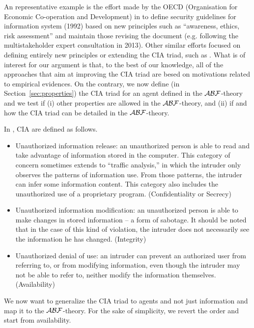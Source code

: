 An representative example is the effort made by the OECD (Organisation for Economic
Co-operation and Development) in \autocite{OECD2013guidelines} to define
security guidelines for information system (1992) based on new principles such
as ``awareness, ethics, risk assessment'' and maintain those revising the
document (e.g.  following the multistakeholder expert consultation in 2013).
Other similar efforts focused on defining entirely new principles or extending
the CIA triad, such as \autocite{NISTSP800-160}. What is of interest for our
argument is that, to the best of our knowledge, all of the approaches that aim
at improving the CIA triad are besed on motivations related to empirical evidences. On the contrary,
we now define (in Section~\ref{sec:properties}) the CIA triad for an agent
defined in the $\mathcal{A}\mathcal{B}\mathcal{F}$-theory and we test if (i) other properties are
allowed in the $\mathcal{A}\mathcal{B}\mathcal{F}$-theory, and (ii) if and how the CIA triad can be
detailed in the $\mathcal{A}\mathcal{B}\mathcal{F}$-theory.

In \autocite{Anderson1972report,Samonas2014cia}, CIA are defined as follows.
\begin{itemize}
	\item Unauthorized information release: an unauthorized person is able
		to read and take  advantage  of  information  stored  in  the
		computer.  This  category of concern  sometimes  extends  to
		``traffic  analysis,''  in  which  the intruder  only observes
		the  patterns  of  information  use.  From  those patterns,
		the  intruder can   infer   some   information   content.
		This category   also   includes   the unauthorized use of a
		proprietary program.  (Confidentiality or Secrecy) 
	\item Unauthorized  information  modification:  an  unauthorized person
		is  able  to make changes in stored information -- a form  of
		sabotage.  It should be noted that in the case of this kind of
		violation, the intruder does not necessarily see the
		information he has changed.  (Integrity)
	\item Unauthorized  denial  of  use:  an  intruder  can  prevent  an
		authorized  user  from referring to, or from modifying
		information, even though the intruder may not be able to refer
		to, neither modify the information themselves. (Availability)
\end{itemize}

We now want to generalize the CIA triad to agents and not just 
information and map it to the $\mathcal{A}\mathcal{B}\mathcal{F}$-theory. For the sake of simplicity,
we revert the order and start from availability.

